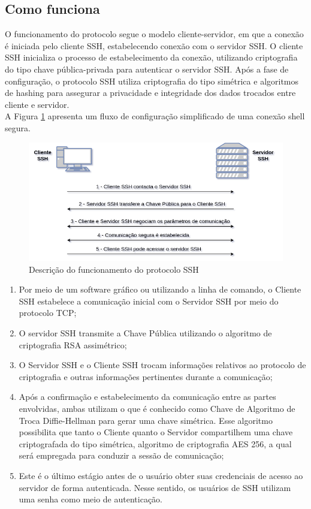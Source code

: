 \documentclass[12pt]{article}
\begin{document}
\subsection{Como funciona}
O funcionamento do protocolo segue o modelo cliente-servidor, em que a conexão é iniciada pelo cliente SSH, estabelecendo conexão com o servidor SSH. O cliente SSH inicializa o processo de estabelecimento da conexão, utilizando criptografia do tipo chave pública-privada para autenticar o servidor SSH. Após a fase de configuração, o protocolo SSH utiliza criptografia do tipo simétrica e algoritmos de hashing para assegurar a privacidade e integridade dos dados trocados entre cliente e servidor.\\

A Figura \ref{fig:protocolo_ssh} apresenta um fluxo de configuração simplificado de uma conexão shell segura.

\begin{figure}[H]
	\centering
	\includegraphics[scale=0.63]{protocolo_ssh.png}
	\caption{Descrição do funcionamento do protocolo SSH}
	\label{fig:protocolo_ssh}
\end{figure}

\begin{enumerate}
	\item Por meio de um software gráfico ou utilizando a linha de comando, o Cliente SSH estabelece a comunicação inicial com o Servidor SSH por meio do protocolo TCP;
	\item O servidor SSH transmite a Chave Pública utilizando o algoritmo de criptografia RSA assimétrico;
	\item O Servidor SSH e o Cliente SSH trocam informações relativos ao protocolo de criptografia e outras informações pertinentes durante a comunicação;
	\item Após a confirmação e estabelecimento da comunicação entre as partes envolvidas, ambas utilizam o que é conhecido como Chave de Algoritmo de Troca Diffie-Hellman para gerar uma chave simétrica. Esse algoritmo possibilita que tanto o Cliente quanto o Servidor compartilhem uma chave criptografada do tipo simétrica, algoritmo de criptografia AES 256, a qual será empregada para conduzir a sessão de comunicação;
	\item Este é o último estágio antes de o usuário obter suas credenciais de acesso ao servidor de forma autenticada. Nesse sentido, os usuários de SSH utilizam uma senha como meio de autenticação.
  \end{enumerate}
\pagebreak
\end{document}
